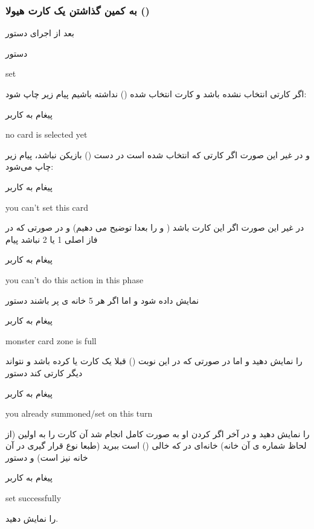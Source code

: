 \documentclass[]{article}
\begin{document}
\subsubsection*{{\titr به کمین گذاشتن یک کارت هیولا ()}}
    بعد از اجرای دستور
\begin{mybox}[colback=yellow]{دستور}
	\begin{latin}	
		set
	\end{latin}
\end{mybox}
اگر کارتی انتخاب نشده باشد و کارت انتخاب شده () نداشته باشیم 
پیام زیر چاپ شود:
\begin{mybox}[colback=yellow]{پیغام به کاربر}
	\begin{latin}	
		no card is selected yet
	\end{latin}
\end{mybox}
و در غیر این صورت اگر کارتی که انتخاب شده است در دست () بازیکن 
نباشد، پیام زیر چاپ می‌شود:

\begin{mybox}[colback=yellow]{پیغام به کاربر}
	\begin{latin}	
		you can’t set this card
	\end{latin}
\end{mybox}
در غیر این صورت اگر این کارت  باشد ( و  را 
بعدا توضیح می دهیم) و در صورتی که در فاز اصلی 1 یا 2 نباشد پیام
\begin{mybox}[colback=yellow]{پیغام به کاربر}
	\begin{latin}	
		you can’t do this action in this phase
	\end{latin}
\end{mybox}
نمایش داده شود و اما اگر هر 5 خانه ی  پر باشند دستور
\begin{mybox}[colback=yellow]{پیغام به کاربر}
	\begin{latin}	
		monster card zone is full
	\end{latin}
\end{mybox}
را نمایش دهید و اما در صورتی که در این نوبت () قبلا یک کارت 
 یا  کرده باشد و نتواند دیگر کارتی  کند دستور
\begin{mybox}[colback=yellow]{پیغام به کاربر}
	\begin{latin}	
		you already summoned/set on this turn
	\end{latin}
\end{mybox}
را نمایش دهید و در آخر اگر  کردن او به صورت کامل انجام شد آن کارت را 
به اولین (از لحاظ شماره ی آن خانه) خانه‌ای در  که خالی 
() است ببرید (طبعا نوع قرار گیری در آن خانه نیز  است) و 
دستور
\begin{mybox}[colback=yellow]{پیغام به کاربر}
	\begin{latin}	
		set successfully
	\end{latin}
\end{mybox}
را نمایش دهید.
\end{document}
